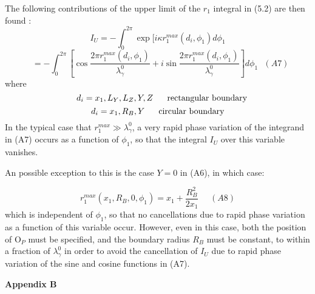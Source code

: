 { \par    The following contributions of the upper limit of the $r_1$ integral in (5.2) are then 
    found :
  \[ I_U = -\int_0^{2 \pi} \exp[i\kappa r_1^{max}(d_i, \phi_1) d \phi_1 \]
  \[ ~~~ =  -\int_0^{2 \pi}\left[ \cos\frac{2 \pi  r_1^{max}(d_i, \phi_1)}{\lambda_{\gamma}^0} +
  i\sin \frac{2 \pi  r_1^{max}(d_i, \phi_1)}{\lambda_{\gamma}^0}\right] d \phi_1 ~~~(A7) \]
  where
\[~~~d_i = x_1, L_Y, L_Z, Y, Z~~~~~ {\rm rectangular~boundary} \]
\[ d_i = x_1, R_B, Y~~~~~{\rm circular~boundary} \]
  In the typical case that $r_1^{max} \gg \lambda_{\gamma}^0$, a very rapid phase variation 
  of the integrand in (A7) occurs as a function of $\phi_1$, so that the integral $I_U$ 
   over this variable vanishes.
   \par An possible exception to this is the case $Y = 0$ in (A6), in which case:

  \[  r_1^{max}(x_1,R_B,0,\phi_1) = x_1 + \frac{R_B^2}{2 x_1}~~~~~~(A8)\]
     which is independent of  $\phi_1$, so that no cancellations due to rapid phase variation
    as a function of this variable occur.
   However, even in this case, both the position of O$_P$ must be specified, and the boundary radius
     $R_B$ must be constant, to within a fraction of $\lambda_{\gamma}^0$ in order to avoid the 
    cancellation of $I_U$ due to rapid phase variation of the sine and cosine 
    functions in (A7).


 \newpage
  {\bf Appendix B}

}
